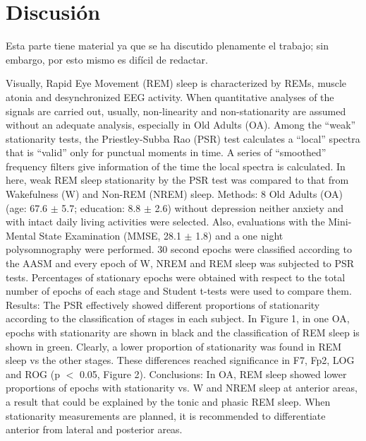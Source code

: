 \chapter{Discusi\'on}

Esta parte tiene material ya que se ha discutido plenamente el trabajo; sin embargo, por esto
mismo es dif\'icil de redactar.

Visually, Rapid Eye Movement (REM) sleep is characterized by REMs, muscle atonia and 
desynchronized EEG activity. When quantitative analyses of the signals are carried out, usually, 
non-linearity and non-stationarity are assumed without an adequate analysis, especially in 
Old Adults (OA). Among the “weak” stationarity tests, the Priestley-Subba Rao (PSR) test 
calculates a “local” spectra that is “valid” only for punctual moments in time. A series of 
“smoothed” frequency filters give information of the time the local spectra is calculated. 
In here, weak REM sleep stationarity by the PSR test was compared to that from Wakefulness (W) 
and Non-REM (NREM) sleep. Methods:  8 Old Adults (OA) 
(age: 67.6 $\pm$ 5.7; education: 8.8 $\pm$ 2.6) 
without depression neither anxiety and with intact daily living activities were selected. Also, 
evaluations with the Mini-Mental State Examination (MMSE, 28.1 $\pm$ 1.8) and a one night 
polysomnography were performed. 30 second epochs were classified according to the AASM and every 
epoch of W, NREM and REM sleep was subjected to PSR tests. Percentages of stationary epochs were 
obtained with respect to the total number of epochs of each stage and Student t-tests were used 
to compare them. Results: The PSR effectively showed different proportions of stationarity 
according to the classification of stages in each subject. In Figure 1, in one OA, epochs with 
stationarity are shown in black and the classification of REM sleep is shown in green. Clearly, 
a lower proportion of stationarity was found in REM sleep vs the other stages. These differences 
reached significance in F7, Fp2, LOG and ROG (p $<$ 0.05, Figure 2). Conclusions: In OA, REM sleep 
showed lower proportions of epochs with stationarity vs. W and NREM sleep at anterior areas, a 
result that could be explained by the tonic and phasic REM sleep. When stationarity measurements 
are planned, it is recommended to differentiate anterior from lateral and posterior areas.

